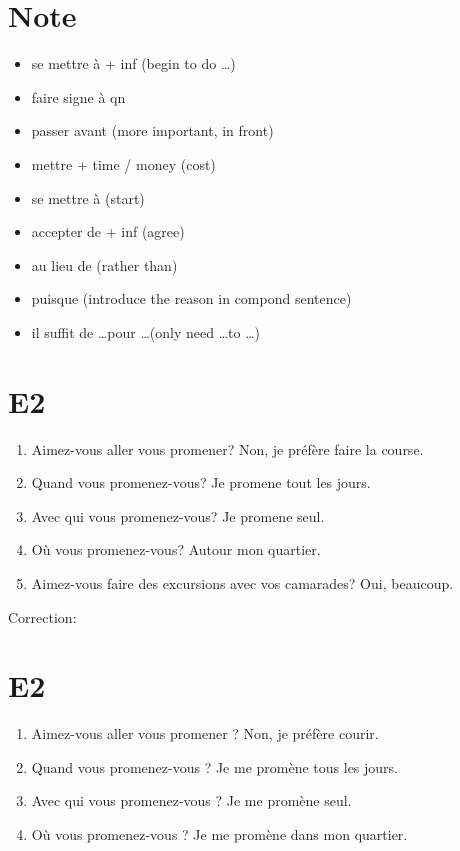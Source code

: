 \documentclass{book}
\begin{document}
    \section{Note}
        \begin{itemize}
            \item se mettre à + inf (begin to do \dots)
            \item faire signe à qn
            \item passer avant (more important, in front)
            \item mettre + time / money (cost)
            \item se mettre à (start)
            \item accepter de + inf (agree)
            \item au lieu de (rather than)
            \item puisque (introduce the reason in compond sentence)
            \item il suffit de \dots pour \dots (only need \dots to \dots)
        \end{itemize}

    \section{E2}
        \begin{enumerate}
            \item Aimez-vous aller vous promener? Non, je préfère faire la course.
            \item Quand vous promenez-vous? Je promene tout les jours.
            \item Avec qui vous promenez-vous? Je promene seul.
            \item Où vous promenez-vous? Autour mon quartier.
            \item Aimez-vous faire des excursions avec vos camarades? Oui, beaucoup.
        \end{enumerate}
        Correction:
        \section{E2}
        \begin{enumerate}
            \item Aimez-vous aller vous promener ? Non, je préfère courir.
            \item Quand vous promenez-vous ? Je me promène tous les jours.
            \item Avec qui vous promenez-vous ? Je me promène seul.
            \item Où vous promenez-vous ? Je me promène dans mon quartier.
        \end{enumerate}
\end{document}
